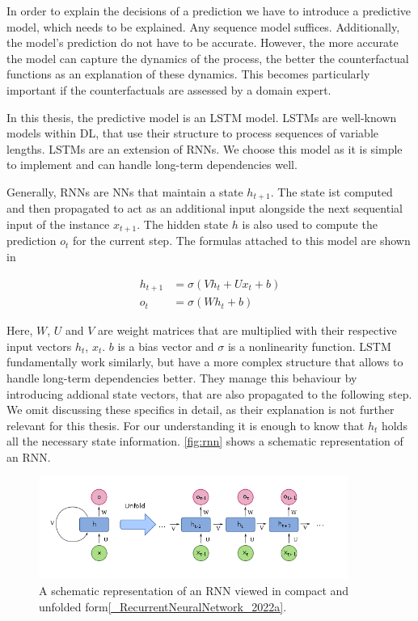 \documentclass[./../../paper.tex]{subfiles}
\begin{document}
In order to explain the decisions of a prediction we have to introduce a predictive model, which needs to be explained. Any sequence model suffices. Additionally, the model's prediction do not have to be accurate. However, the more accurate the model can capture the dynamics of the process, the better the counterfactual functions as an explanation of these dynamics. This becomes particularly important if the counterfactuals are assessed by a domain expert. 

In this thesis, the predictive model is an \gls{LSTM} model. LSTMs are well-known models within \gls{DL}, that use their structure to process sequences of variable lengths\autocite{hochreiter_LongShortTermMemory_1997}. LSTMs are an extension of \glspl{RNN}. We choose this model as it is simple to implement and can handle long-term dependencies well.

Generally, \glspl{RNN} are \glspl{NN} that maintain a state $h_{t+1}$. The state ist computed and then propagated to act as an additional input alongside the next sequential input of the instance $x_{t+1}$. The hidden state $h$ is also used to compute the prediction $o_{t}$ for the current step. The formulas attached to this model are shown in 

\begin{align}
    \label{eq:rnn}
    h_{t+1} &= \sigma(V h_t + U x_t + b)\\
    o_{t} &= \sigma(W h_t + b)
\end{align}

Here, $W$, $U$ and $V$ are weight matrices that are multiplied with their respective input vectors $h_t$, $x_t$. $b$ is a bias vector and $\sigma$ is a nonlinearity function. LSTM fundamentally work similarly, but have a more complex structure that allows to handle long-term dependencies better. They manage this behaviour by introducing addional state vectors, that are also propagated to the following step. We omit discussing these specifics in detail, as their explanation is not further relevant for this thesis. For our understanding it is enough to know that $h_t$ holds all the necessary state information. \autoref{fig:rnn} shows a schematic representation of an RNN.   

\begin{figure}[htb]
    \label{fig:rnn}
    \centering
    \includegraphics[width=0.9\textwidth]{figures/rnn.png}
    \caption{A schematic representation of an RNN viewed in compact and unfolded form\autoref{_RecurrentNeuralNetwork_2022a}.}
\end{figure}
\end{document}
